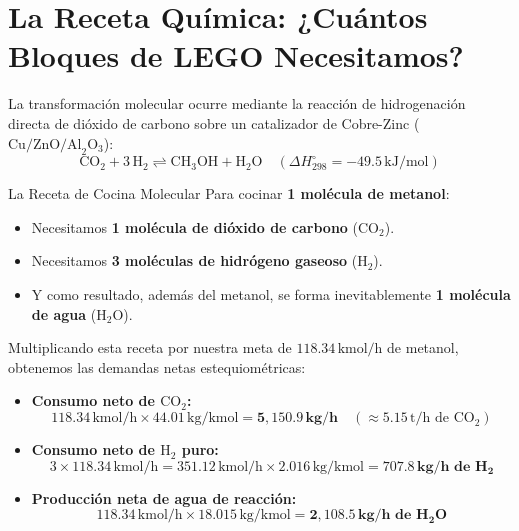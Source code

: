 \documentclass[11pt,a4paper]{article}
\begin{document}
\section{La Receta Química: ¿Cuántos Bloques de LEGO Necesitamos?}

La transformación molecular ocurre mediante la reacción de hidrogenación directa de dióxido de carbono sobre un catalizador de Cobre-Zinc ($\text{Cu/ZnO/Al}_2\text{O}_3$):
\begin{equation}
    \text{CO}_2 + 3\,\text{H}_2 \rightleftharpoons \text{CH}_3\text{OH} + \text{H}_2\text{O} \quad (\Delta H^\circ_{298} = -49.5\,\text{kJ/mol})
\end{equation}

\begin{pedagogico}{La Receta de Cocina Molecular}
Para cocinar \textbf{1 molécula de metanol}:
\begin{itemize}
    \item Necesitamos \textbf{1 molécula de dióxido de carbono} ($\text{CO}_2$).
    \item Necesitamos \textbf{3 moléculas de hidrógeno gaseoso} ($\text{H}_2$).
    \item Y como resultado, además del metanol, se forma inevitablemente \textbf{1 molécula de agua} ($\text{H}_2\text{O}$).
\end{itemize}
\end{pedagogico}

Multiplicando esta receta por nuestra meta de $118.34\,\text{kmol/h}$ de metanol, obtenemos las demandas netas estequiométricas:
\begin{itemize}
    \item \textbf{Consumo neto de $\text{CO}_2$:} 
    \begin{equation}
        118.34\,\text{kmol/h} \times 44.01\,\text{kg/kmol} = \mathbf{5{,}150.9\,\text{kg/h}} \quad (\approx 5.15\,\text{t/h de }\text{CO}_2)
    \end{equation}
    \item \textbf{Consumo neto de $\text{H}_2$ puro:}
    \begin{equation}
        3 \times 118.34\,\text{kmol/h} = 351.12\,\text{kmol/h} \times 2.016\,\text{kg/kmol} = \mathbf{707.8\,\text{kg/h de }\text{H}_2}
    \end{equation}
    \item \textbf{Producción neta de agua de reacción:}
    \begin{equation}
        118.34\,\text{kmol/h} \times 18.015\,\text{kg/kmol} = \mathbf{2{,}108.5\,\text{kg/h de }\text{H}_2\text{O}}
    \end{equation}
\end{itemize}
\end{document}
